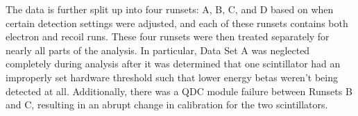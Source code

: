 The data is further split up into four runsets:  A, B, C, and D based on when certain detection settings were adjusted, and each of these runsets contains both electron and recoil runs.  These four runsets were then treated separately for nearly all parts of the analysis.  In particular, Data Set A was neglected completely during analysis after it was determined that one scintillator had an improperly set hardware threshold such that lower energy betas weren't being detected at all.  Additionally, there was a QDC module failure between Runsets B and C, resulting in an abrupt change in calibration for the two scintillators.  






